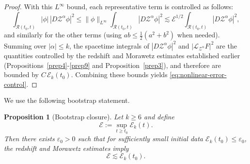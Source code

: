 \documentclass[11pt]{article}
\numberwithin{equation}{section}
\theoremstyle{plain}
\newtheorem{proposition}[theorem]{Proposition}
\theoremstyle{definition}
\theoremstyle{remark}
\begin{document}
\begin{proof}
With this $L^\infty$ bound, each representative term is controlled as follows:
\begin{equation}
\int_{\mathcal R(t_{0},t)} |\phi|\,|D\mathcal Z^\alpha\phi|^{2}
\le
\|\phi\|_{L^\infty}\int_{\mathcal R(t_{0},t)} |D\mathcal Z^\alpha\phi|^{2}
\lesssim
\mathcal E^{1/2}\int_{\mathcal R(t_{0},t)} |D\mathcal Z^\alpha\phi|^{2},
\end{equation}
and similarly for the other terms (using $ab\le \tfrac12(a^{2}+b^{2})$ when needed).
Summing over $|\alpha|\le k$, the spacetime integrals of $|D\mathcal Z^\alpha\phi|^{2}$ and $|\mathcal L_{\mathcal Z^\alpha}F|^{2}$ are the quantities controlled by the redshift and Morawetz estimates established earlier (Propositions~\ref{prep4}-\ref{prep9} and Proposition~\ref{prep3}), and therefore are bounded by $C\,\mathcal E_{k}(t_{0})$.
Combining these bounds yields \eqref{eq:nonlinear-error-control}.
\end{proof}

We use the following bootstrap statement.
\begin{proposition}[Bootstrap closure]\label{prop:bootstrap-closure}
Let $k\ge 6$ and define
\begin{equation}
 \mathcal{E} := \sup_{t\ge t_0} \mathcal{E}_k(t).
\end{equation}
Then there exists $\varepsilon_0>0$ such that for sufficiently small initial data
$\mathcal{E}_k(t_0)\le \varepsilon_0$, the redshift and Morawetz estimates imply
\begin{equation}
 \mathcal{E} \lesssim \mathcal{E}_k(t_0).
\end{equation}
\end{proposition}
\end{document}
